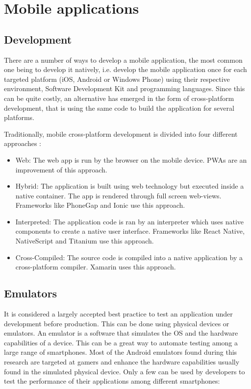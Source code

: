 \documentclass{kththesis}
\begin{document}
\section{Mobile applications}
\subsection{Development}
There are a number of ways to develop a mobile application, the most common one being to develop it natively, i.e. develop the mobile application once for each targeted platform (iOS, Android or Windows Phone) using their respective environment, Software Development Kit and programming languages. Since this can be quite costly, an alternative has emerged in the form of cross-platform development, that is using the same code to build the application for several platforms.


Traditionally, mobile cross-platform development is divided into four different approaches \cite{CrossPlatform_dev}:
\begin{itemize}
    \item Web: The web app is run by the browser on the mobile device. PWAs are an improvement of this approach.
    \item Hybrid: The application is built using web technology but executed inside a native container. The app is rendered through full screen web-views. Frameworks like PhoneGap and Ionic \cite{crossplatform_approaches} use this approach.
    \item Interpreted: The application code is ran by an interpreter which uses native components to create a native user interface. Frameworks like React Native, NativeScript and Titanium \cite{emulating_native_w_crossplatform} use this approach.
    \item Cross-Compiled: The source code is compiled into a native application by a cross-platform compiler. Xamarin \cite{crossplatform_approaches} uses this approach. 
\end{itemize}


\subsection{Emulators}
    It is considered a largely accepted best practice to test an application under development before production. This can be done using physical devices or emulators. An emulator is a software that simulates the OS and the hardware capabilities of a device\cite{emulator_def}. This can be a great way to automate testing among a large range of smartphones. Most of the Android emulators found during this research are targeted at gamers and enhance the hardware capabilities usually found in the simulated physical device. Only a few can be used by developers to test the performance of their applications among different smartphones:
    
\end{document}
